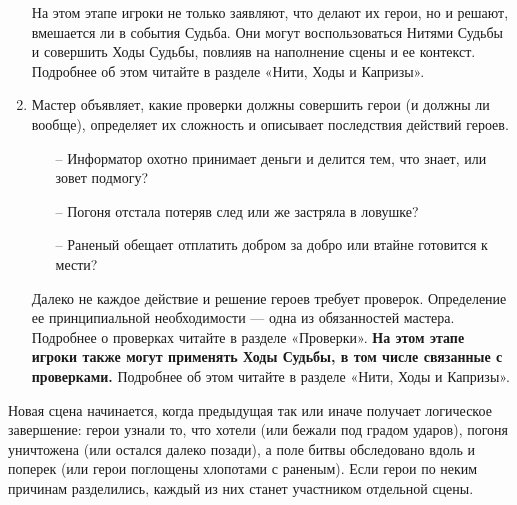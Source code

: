 \begin{enumerate}
\begin{itemize}
\end{itemize}
На этом этапе игроки не только заявляют, что делают их герои, но и решают, вмешается ли в события Судьба. Они могут воспользоваться Нитями Судьбы и совершить Ходы Судьбы, повлияв на наполнение сцены и ее контекст. Подробнее об этом читайте в разделе «Нити, Ходы и Капризы».
\item Мастер объявляет, какие проверки должны совершить герои (и должны ли вообще), определяет их сложность и описывает последствия действий героев.
\begin{itemize}
\item[--] Информатор охотно принимает деньги и делится тем, что знает, или зовет подмогу?
\item[--]  Погоня отстала потеряв след или же застряла в ловушке?
\item[--]  Раненый обещает отплатить добром за добро или втайне готовится к мести?
\end{itemize}
Далеко не каждое действие и решение героев требует проверок. Определение ее принципиальной необходимости — одна из обязанностей мастера. Подробнее о проверках читайте в разделе «Проверки».
\linebreak \textbf{На этом этапе игроки также могут применять Ходы Судьбы, в том числе связанные с проверками.} Подробнее об этом читайте в разделе «Нити, Ходы и Капризы».
\end{enumerate}
Новая сцена начинается, когда предыдущая так или иначе получает логическое завершение: герои узнали  то, что хотели (или бежали под градом ударов), погоня уничтожена (или остался далеко позади), а поле битвы обследовано вдоль и поперек (или герои поглощены хлопотами с раненым). Если герои по неким причинам разделились, каждый из них станет участником отдельной сцены.